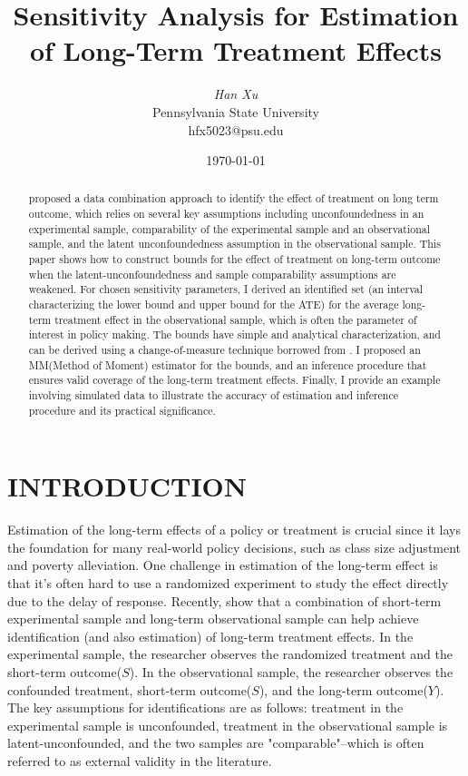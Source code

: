 \documentclass[12pt]{article}
\title{\bfseries\Large Sensitivity Analysis for Estimation of Long-Term Treatment Effects \vspace*{-1ex}}
\author{\large\textit{Han Xu} \\
	\large \textup{Pennsylvania State University}\\\textup{hfx5023@psu.edu}}
\date{\today}
\begin{document}
	
	\maketitle
	
	\begin{abstract}
	\textcite{athey2020combining} proposed a data combination approach to identify the effect of treatment on long term outcome, which relies on several key assumptions including unconfoundedness in an experimental sample, comparability of the experimental sample and an observational sample, and the latent unconfoundedness assumption in the observational sample. This paper shows how to construct bounds for the effect of treatment on long-term outcome when the latent-unconfoundedness and sample comparability assumptions are weakened. For chosen sensitivity parameters, I derived an identified set (an interval characterizing the lower bound and upper bound for the ATE) for the average long-term treatment effect in the observational sample, which is often the parameter of interest in policy making.
    The bounds have simple and analytical characterization, and can be derived using a change-of-measure technique borrowed from \textcite{yadlowsky2018bounds}. 
    I proposed an MM(Method of Moment) estimator for the bounds, and an inference procedure that ensures valid coverage of the long-term treatment effects.
    Finally, I provide an example involving simulated data to illustrate the accuracy of estimation and inference procedure and its practical significance.
	\end{abstract}

    \section{INTRODUCTION}
    
    Estimation of the long-term effects of a policy or treatment is crucial since it lays the foundation for many real-world policy decisions, such as class size adjustment and poverty alleviation. One challenge in estimation of the long-term effect is that it's often hard to use a randomized experiment to study the effect directly due to the delay of response. Recently, \textcite{athey2020combining} show that a combination of short-term experimental sample and long-term observational sample can help achieve identification (and also estimation) of long-term treatment effects. In the experimental sample, the researcher observes the randomized treatment and the short-term outcome($S$). In the observational sample, the researcher observes the confounded treatment, short-term outcome($S$), and the long-term outcome($Y$). The key assumptions for identifications are as follows: treatment in the experimental sample is unconfounded, treatment in the observational sample is latent-unconfounded, and the two samples are "comparable"--which is often referred to as external validity in the literature.
	
\end{document}
